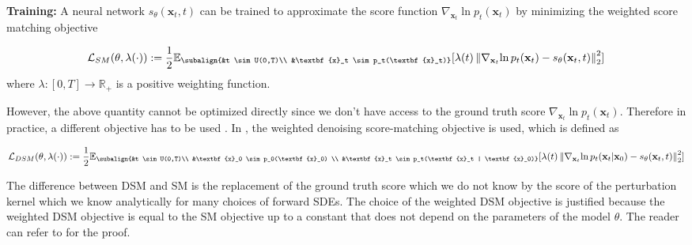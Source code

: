 
\textbf{Training:} A neural network $s_\theta(\textbf{x}_t,t)$ can be trained to approximate the score function $\nabla_{\textbf{x}_t}{\ln{p_t(\textbf{x}_t)}}$ by minimizing the weighted score matching objective

\begin{gather}
\begin{aligned}
    \mathcal{L}_{SM}(\theta, \lambda(\cdot)) := 
    \frac{1}{2} \mathbb{E}_{\subalign{&t \sim U(0,T)\\ &\textbf{x}_t \sim p_t(\textbf{x}_t)}} [\lambda(t) \norm{\nabla_{\textbf{x}_t}{\ln{p_t(\textbf{x}_t)}} - s_\theta(\textbf{x}_t,t)}_2^2]
\end{aligned}
\end{gather}
where $\lambda: [0,T] \xrightarrow{} \mathbb{R}_+$ is a positive weighting function.

However, the above quantity cannot be optimized directly since we don't have access to the ground truth score $\nabla_{\textbf{x}_t}{\ln{p_t(\textbf{x}_t)}}$. Therefore in practice, a different objective has to be used \cite{score_matching, vincent2011connection, song2020score}. In \cite{song2020score}, the weighted denoising score-matching objective is used, which is defined as 

\begin{gather}\label{ch3:DSM_for_uniform_diffusion_models}
\begin{aligned}
    \mathcal{L}_{DSM}(\theta, \lambda(\cdot)) := 
    \frac{1}{2} \mathbb{E}_{\subalign{&t \sim U(0,T)\\ &\textbf{x}_0 \sim p_0(\textbf{x}_0) \\ &\textbf{x}_t \sim p_t(\textbf{x}_t | \textbf{x}_0)}} [\lambda(t) \norm{\nabla_{\textbf{x}_t}{\ln{p_t(\textbf{x}_t | \textbf{x}_0)}} - s_\theta(\textbf{x}_t,t)}_2^2]
\end{aligned}
\end{gather}

The difference between DSM and SM is the replacement of the ground truth score which we do not know by the score of the perturbation kernel which we know analytically for many choices of forward SDEs. The choice of the weighted DSM objective is justified because the weighted DSM objective is equal to the SM objective up to a constant that does not depend on the parameters of the model $\theta$. The reader can refer to \cite{vincent2011connection} for the proof. 

